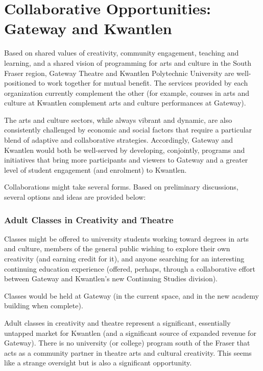 \documentclass[12pt,DIV10,oneside,headsepline,letterpaper]{scrreprt}
\begin{document}
\section{Collaborative Opportunities: Gateway and Kwantlen}

Based on shared values of creativity, community engagement, teaching and learning, and a shared vision of programming for arts and culture in the South Fraser region, Gateway Theatre and Kwantlen Polytechnic University are well-positioned to work together for mutual benefit. The services provided by each organization currently complement the other (for example, courses in arts and culture at Kwantlen complement arts and culture performances at Gateway). 

The arts and culture sectors, while always vibrant and dynamic, are also consistently challenged by economic and social factors that require a particular blend of adaptive and collaborative strategies. Accordingly, Gateway and Kwantlen would both be well-served by developing, conjointly, programs and initiatives that bring more participants and viewers to Gateway and a greater level of student engagement (and enrolment) to Kwantlen.

Collaborations might take several forms. Based on preliminary discussions, several options and ideas are provided below:

\subsubsection{Adult Classes in Creativity and Theatre}

Classes might be offered to university students working toward degrees in arts and culture, members of the general public wishing to explore their own creativity (and earning credit for it), and anyone searching for an interesting continuing education experience (offered, perhaps, through a collaborative effort between Gateway and Kwantlen's new Continuing Studies division).

Classes would be held at Gateway (in the current space, and in the new academy building when complete).

Adult classes in creativity and theatre represent a significant, essentially untapped market for Kwantlen (and a significant source of expanded revenue for Gateway). There is no university (or college) program south of the Fraser that acts as a community partner in theatre arts and cultural creativity. This seems like a strange oversight but is also a significant opportunity.
\end{document}
